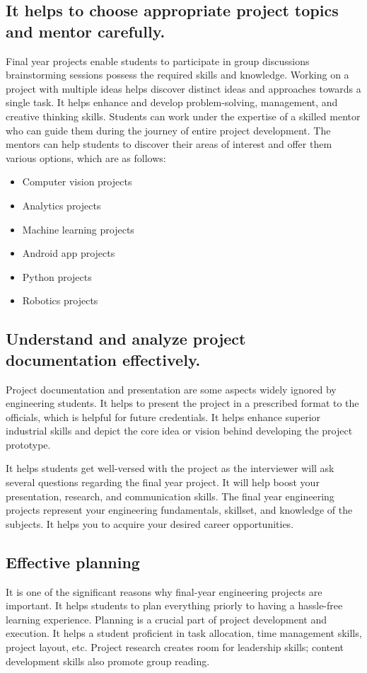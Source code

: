 \subsection{It helps to choose appropriate project topics and mentor carefully.}
Final year projects enable students to participate in group discussions brainstorming sessions possess the required skills and knowledge. Working on a project with multiple ideas helps discover distinct ideas and approaches towards a single task. It helps enhance and develop problem-solving, management, and creative thinking skills. Students can work under the expertise of a skilled mentor who can guide them during the journey of entire project development. The mentors can help students to discover their areas of interest and offer them various options, which are as follows:
\begin{itemize}
	\item Computer vision projects \cite{Bradshaw}
	\item Analytics projects
        \item Machine learning projects
        \item Android app projects
        \item Python projects
        \item Robotics projects
\end{itemize}




\subsection{Understand and analyze project documentation effectively.}
Project documentation and presentation are some aspects widely ignored by engineering students. It helps to present the project in a prescribed format to the officials, which is helpful for future credentials. It helps enhance superior industrial skills and depict the core idea or vision behind developing the project prototype.

It helps students get well-versed with the project as the interviewer will ask several questions regarding the final year project. It will help boost your presentation, research, and communication skills. The final year engineering projects represent your engineering fundamentals, skillset, and knowledge of the subjects. It helps you to acquire your desired career opportunities.


\subsection{Effective planning}
It is one of the significant reasons why final-year engineering projects are important. It helps students to plan everything priorly to having a hassle-free learning experience. Planning is a crucial part of project development and execution. It helps a student proficient in task allocation, time management skills, project layout, etc. Project research creates room for leadership skills; content development skills also promote group reading.

